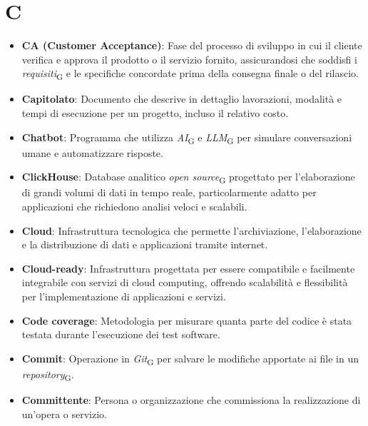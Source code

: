 \section{C}
\begin{itemize}
    \item \textbf{CA (Customer Acceptance)}: Fase del processo di sviluppo in cui il cliente verifica e approva il prodotto o il servizio fornito, assicurandosi che soddisfi i \textit{requisiti}\textsubscript{G} e le specifiche concordate prima della consegna finale o del rilascio.
    \item \textbf{Capitolato}: Documento che descrive in dettaglio lavorazioni, modalità e tempi di esecuzione per un progetto, incluso il relativo costo.
    \item \textbf{Chatbot}: Programma che utilizza \textit{AI}\textsubscript{G} e \textit{LLM}\textsubscript{G} per simulare conversazioni umane e automatizzare risposte.
    \item \textbf{ClickHouse}: Database analitico \textit{open source}\textsubscript{G} progettato per l'elaborazione di grandi volumi di dati in tempo reale, particolarmente adatto per applicazioni che richiedono analisi veloci e scalabili.
    \item \textbf{Cloud}: Infrastruttura tecnologica che permette l'archiviazione, l'elaborazione e la distribuzione di dati e applicazioni tramite internet.
    \item \textbf{Cloud-ready}: Infrastruttura progettata per essere compatibile e facilmente integrabile con servizi di cloud computing, offrendo scalabilità e flessibilità per l'implementazione di applicazioni e servizi.
    \item \textbf{Code coverage}: Metodologia per misurare quanta parte del codice è stata testata durante l'esecuzione dei test software.
    \item \textbf{Commit}: Operazione in \textit{Git}\textsubscript{G} per salvare le modifiche apportate ai file in un \textit{repository}\textsubscript{G}.
    \item \textbf{Committente}: Persona o organizzazione che commissiona la realizzazione di un'opera o servizio.

\end{itemize}
